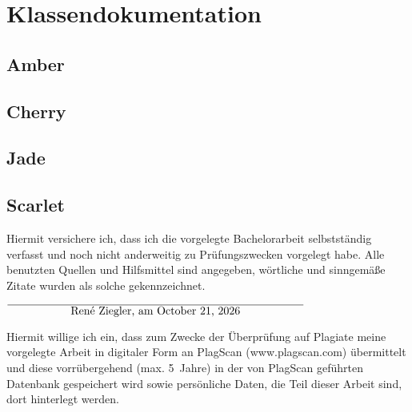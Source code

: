 \documentclass[12pt,oneside,a4paper,parskip]{scrbook}
\def\BaAuthor{René Ziegler}
\begin{document}
\section{Klassendokumentation}
\subsection{Amber}
\subsection{Cherry}
\subsection{Jade}
\subsection{Scarlet}


\backmatter

\listoffigures
{}

\listoftables


\printbibliography
{}



Hiermit versichere ich, dass ich die vorgelegte Bachelorarbeit selbstständig verfasst und noch nicht anderweitig zu Prüfungszwecken vorgelegt habe. Alle benutzten Quellen und Hilfsmittel sind angegeben, wörtliche und sinngemäße Zitate wurden als solche gekennzeichnet.

\vspace{20pt}
\begin{flushright}
$\overline{~~~~~~~~~~~~~~~~~\mbox{\BaAuthor, am \today}~~~~~~~~~~~~~~~~~}$
\end{flushright}


Hiermit willige ich ein, dass zum Zwecke der Überprüfung auf Plagiate meine vorgelegte Arbeit in digitaler Form an PlagScan (www.plagscan.com) übermittelt und diese vorrübergehend (max. 5~Jahre) in der von PlagScan geführten Datenbank gespeichert wird sowie persönliche Daten, die Teil dieser Arbeit sind, dort hinterlegt werden.
\end{document}
